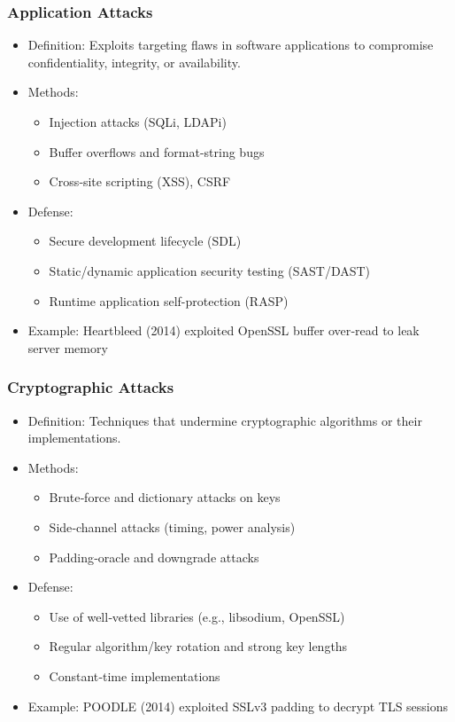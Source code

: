 \documentclass[11pt]{article}
\begin{document}
\subsubsection{Application Attacks}
\label{sec:orge9f5dba}
\begin{itemize}
\item Definition: Exploits targeting flaws in software applications to compromise confidentiality, integrity, or availability.
\item Methods:
\begin{itemize}
\item Injection attacks (SQLi, LDAPi)
\item Buffer overflows and format-string bugs
\item Cross‑site scripting (XSS), CSRF
\end{itemize}
\item Defense:
\begin{itemize}
\item Secure development lifecycle (SDL)
\item Static/dynamic application security testing (SAST/DAST)
\item Runtime application self-protection (RASP)
\end{itemize}
\item Example: Heartbleed (2014) exploited OpenSSL buffer over‑read to leak server memory
\end{itemize}
\subsubsection{Cryptographic Attacks}
\label{sec:org257f2bb}
\begin{itemize}
\item Definition: Techniques that undermine cryptographic algorithms or their implementations.
\item Methods:
\begin{itemize}
\item Brute‑force and dictionary attacks on keys
\item Side‑channel attacks (timing, power analysis)
\item Padding‑oracle and downgrade attacks
\end{itemize}
\item Defense:
\begin{itemize}
\item Use of well‑vetted libraries (e.g., libsodium, OpenSSL)
\item Regular algorithm/key rotation and strong key lengths
\item Constant‑time implementations
\end{itemize}
\item Example: POODLE (2014) exploited SSLv3 padding to decrypt TLS sessions
\end{itemize}
\end{document}
